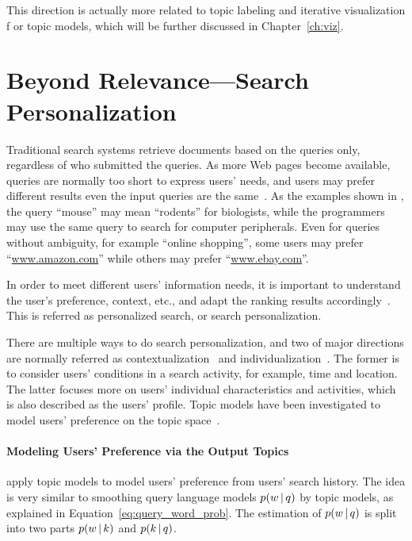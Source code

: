 This direction is actually more related to topic labeling and iterative visualization f
or topic models, which will be further discussed in Chapter~\ref{ch:viz}.

\section{Beyond Relevance---Search Personalization}

Traditional search systems retrieve documents based on the queries only, regardless of who submitted the queries.
As more Web pages become available, queries are normally too short to express users' needs, and
users may prefer different results even the input queries are the same~\citep{Jansen-2000,Dou-2007}.
As the examples shown in \citet{Dou-2007}, the query ``mouse'' may mean ``rodents'' for biologists, 
while the programmers may use the same query to search for computer peripherals. Even for queries without
ambiguity, for example ``online shopping'', some users may prefer ``\url{www.amazon.com}'' while others may
prefer ``\url{www.ebay.com}''.

In order to meet different users' information needs, it is important to understand the user's preference, context,
etc., and adapt the ranking results accordingly~\citep{Pitkow-2002,Micarelli-2007}.
This is referred as personalized search, or search personalization.

There are multiple ways to do search personalization, and two of major directions are normally referred as contextualization~\citep{Melucci-2012} 
and individualization~\citep{Pitkow-2002}. The former is to consider users' conditions in a search activity, for example, time and location.
The latter focuses more on users' individual characteristics and activities, which is also described as the users' profile.
Topic models have been investigated to model users' preference on the topic space~\citep{Song-2010,Carman-2010}.

\paragraph{Modeling Users' Preference via the Output Topics}

\citet{Song-2010} apply topic models to model users' preference from
users' search history. The idea is very similar to smoothing query
language models $p(w \, | \, q)$ by topic models, as explained in Equation~\ref{eq:query_word_prob}. The estimation of $p(w \, | \, q)$ is split into two parts $p(w \, | \, k)$ and $p(k \, | \, q)$.


